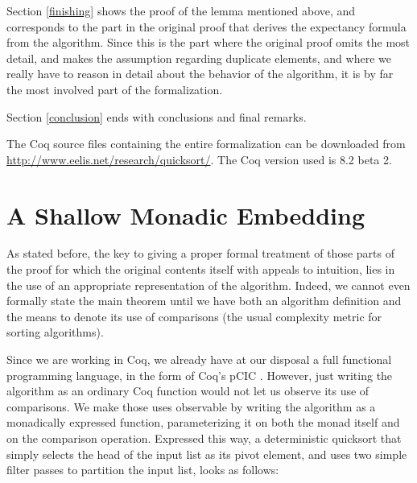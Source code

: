 \documentclass[runningheads]{llncs}
\begin{document}
Section \ref{finishing} shows the proof of the lemma mentioned above, and corresponds to the part in the original proof that derives the expectancy formula from the algorithm. Since this is the part where the original proof omits the most detail, and makes the assumption regarding duplicate elements, and where we really have to reason in detail about the behavior of the algorithm, it is by far the most involved part of the formalization.

Section \ref{conclusion} ends with conclusions and final remarks.

The Coq source files containing the entire formalization can be downloaded from \url{http://www.eelis.net/research/quicksort/}. The Coq version used is 8.2 beta 2.

\section{A Shallow Monadic Embedding}
\label{embed}


As stated before, the key to giving a proper formal treatment of those parts of the proof for which the original contents itself with appeals to intuition, lies in the use of an appropriate representation of the algorithm. Indeed, we cannot even formally state the main theorem until we have both an algorithm definition and the means to denote its use of comparisons (the usual complexity metric for sorting algorithms).

Since we are working in Coq, we already have at our disposal a full functional programming language, in the form of Coq's pCIC \cite{coq'art}. However, just writing the algorithm as an ordinary Coq function would not let us observe its use of comparisons. We make those uses observable by writing the algorithm as a monadically expressed function, parameterizing it on both the monad itself and on the comparison operation. Expressed this way, a deterministic quicksort that simply selects the head of the input list as its pivot element, and uses two simple filter passes to partition the input list, looks as follows:
\end{document}
